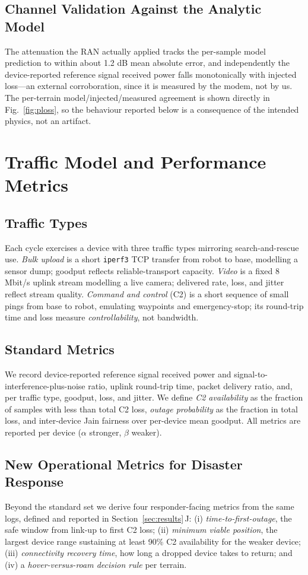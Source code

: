 \documentclass[conference]{IEEEtran}
\begin{document}
\subsection{Channel Validation Against the Analytic Model}
The attenuation the RAN actually applied tracks the per-sample model prediction to
within about 1.2 dB mean absolute error, and independently the device-reported
reference signal received power falls monotonically with injected loss---an external
corroboration, since it is measured by the modem, not by us. The per-terrain
model/injected/measured agreement is shown directly in Fig.~\ref{fig:ploss}, so the
behaviour reported below is a consequence of the intended physics, not an artifact.

\section{Traffic Model and Performance Metrics}
\label{sec:metrics}

\subsection{Traffic Types}
Each cycle exercises a device with three traffic types mirroring search-and-rescue
use. \emph{Bulk upload} is a short \texttt{iperf3} TCP transfer from robot to base,
modelling a sensor dump; goodput reflects reliable-transport capacity. \emph{Video}
is a fixed 8 Mbit/s uplink stream modelling a live camera; delivered rate, loss, and
jitter reflect stream quality. \emph{Command and control} (C2) is a short sequence of
small pings from base to robot, emulating waypoints and emergency-stop; its
round-trip time and loss measure \emph{controllability}, not bandwidth.

\subsection{Standard Metrics}
We record device-reported reference signal received power and signal-to-interference-plus-noise
ratio, uplink round-trip time, packet delivery ratio, and, per traffic type, goodput,
loss, and jitter. We define \emph{C2 availability} as the fraction of samples with less
than total C2 loss, \emph{outage probability} as the fraction in total loss, and
inter-device Jain fairness over per-device mean goodput. All metrics are reported per
device ($\alpha$ stronger, $\beta$ weaker).

\subsection{New Operational Metrics for Disaster Response}
Beyond the standard set we derive four responder-facing metrics from the same logs,
defined and reported in Section~\ref{sec:results}\,J: (i) \emph{time-to-first-outage},
the safe window from link-up to first C2 loss; (ii) \emph{minimum viable position},
the largest device range sustaining at least 90\% C2 availability for the weaker
device; (iii) \emph{connectivity recovery time}, how long a dropped device takes to
return; and (iv) a \emph{hover-versus-roam decision rule} per terrain.
\end{document}
